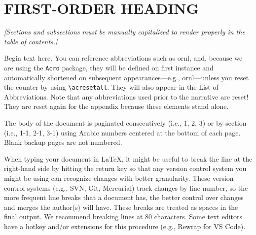 \documentclass[tm]{ornltm} %
\renewcommand{\marginpar}[1]{{\small\em\color{note}[#1]}}
\begin{document}
\mainmatter
\begin{abstract}

The abstract, if short, is inserted here (after \verb|\mainmatter|) before the
introduction section. If the abstract is long, then it should be inserted
\emph{before} \verb|\mainmatter|, and the introduction below will be the first
entry on the page. This \acl{tm} class is used for reports at \acl{ornl}.

\end{abstract}

\acresetall %
\section{FIRST-ORDER HEADING}
\label{sec:firstsec}
\marginpar{Sections and subsections must be manually capitalized to render
properly in the table of contents.}

Begin text here. You can reference abbreviations such as \ac{ornl}, and, because
we are using the \verb|Acro| package, they will be defined on first instance and
automatically shortened on subsequent appearances---e.g., \ac{ornl}---unless you
reset the counter by using \verb|\acresetall|. They will also appear in the List
of Abbreviations. Note that any abbreviations used prior to the narrative are
reset! They are reset again for the appendix because these elements stand alone.

The body of the document is paginated consecutively (i.e., 1, 2, 3) or by
section (i.e., 1-1, 2-1, 3-1) using Arabic numbers centered at the bottom of
each page. Blank backup pages are not numbered.

When typing your document in LaTeX, it might be useful to break the line at the
right-hand side by hitting the return key so that any version control system you
might be using can recognize changes with better granularity. These version
control systems (e.g., SVN, Git, Mercurial) track changes by line number, so the
more frequent line breaks that a document has, the better control over changes
and merges the author(s) will have. These breaks are treated as spaces in the
final output. We recommend breaking lines at 80 characters. Some text editors
have a hotkey and/or extensions for this procedure (e.g., Rewrap for VS Code).
\end{document}
